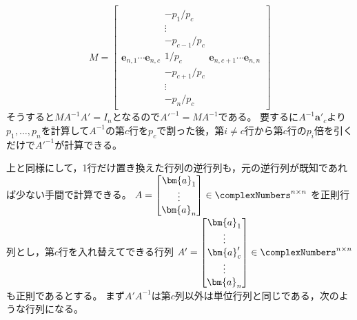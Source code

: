        \[
            M =
            \begin{bmatrix}
                \bm{e}_{n,1}\cdots\bm{e}_{n,c}
                \begin{matrix}
                    -p_1/p_c \\
                    \vdots \\
                    -p_{c-1}/p_c \\
                    1/p_c \\
                    -p_{c+1}/p_c \\
                    \vdots \\
                    -p_n/p_c
                \end{matrix}
                \bm{e}_{n,c+1}\cdots\bm{e}_{n,n}
            \end{bmatrix}
        \]
        そうすると$MA^{-1}A'=I_n$となるので$A'^{-1} = MA^{-1}$である。
        要するに$A^{-1}\bm{a}'_c$より$p_1,\dotsc,p_n$を計算して$A^{-1}$の第$c$行を$p_c$で割った後，第$i\neq c$行から第$c$行の$p_i$倍を引くだけで$A'^{-1}$が計算できる。
        \newline\par
        上と同様にして，1行だけ置き換えた行列の逆行列も，元の逆行列が既知であれば少ない手間で計算できる。
        $
            A =
            \begin{bmatrix}
                \bm{a}_1 \\
                \vdots \\
                \bm{a}_n
            \end{bmatrix}
            \in\complexNumbers^{n\times n}
        $
        を正則行列とし，第$c$行を入れ替えてできる行列
        $
            A' =
            \begin{bmatrix}
                \bm{a}_1 \\
                \vdots \\
                \bm{a}'_c \\
                \vdots \\
                \bm{a}_n
            \end{bmatrix}
            \in\complexNumbers^{n\times n}
        $
        も正則であるとする。
        まず$A'A^{-1}$は第$c$列以外は単位行列と同じである，次のような行列になる。
